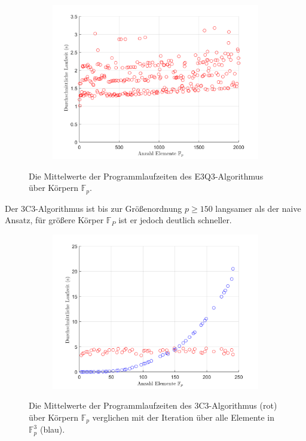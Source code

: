 \documentclass[a4paper,oneside, 11pt, openany%
]{article}
\newcommand{\F}[1]{\mathbb{F}_{#1}}
\theoremstyle{custom}
\theoremstyle{custom}
\begin{document}
	\begin{figure}[H]\label{fig:e3q3_runtime}
		\begin{subfigure}[b]{0.7\textwidth}
			\includegraphics[width=\textwidth]{"images/runtime_e3q3.png"}
		\end{subfigure}
		\caption{Die Mittelwerte der Programmlaufzeiten des E3Q3-Algorithmus über Körpern $\F{p}$.}
	\end{figure}
	Der 3C3-Algorithmus ist bis zur Größenordnung $p \geq 150$ langsamer als der naive Ansatz, für größere Körper $\F{P}$ ist er jedoch deutlich schneller.
	\begin{figure}[H]
		\begin{subfigure}[b]{0.7\textwidth}
			\includegraphics[width=\textwidth]{"images/runtime_e3c3_for_loop.png"}
		\end{subfigure}
		\caption{Die Mittelwerte der Programmlaufzeiten des 3C3-Algorithmus (rot) über Körpern $\F{p}$ verglichen mit der Iteration über alle Elemente in $\F{p}^3$ (blau).}
	\end{figure}
\end{document}
